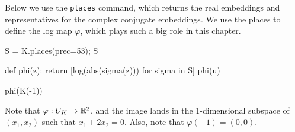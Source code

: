 Below we use the \verb|places| command, which returns the real embeddings
and representatives for the complex conjugate embeddings.
We use the places to define the log map $\varphi$, which plays such a big
role in this chapter.
\begin{sagecode} %
\begin{sagecell}
S = K.places(prec=53); S
\end{sagecell}
\begin{sageout}
\end{sageout}
\begin{sagecell}
def phi(z):
    return [log(abs(sigma(z))) for sigma in S]
phi(u)
\end{sagecell}
\begin{sageout}
[-1.3473773483293832, 0.673688674164692]
\end{sageout}
\begin{sagecell}
phi(K(-1))
\end{sagecell}
\begin{sageout}
[0.0, 0.0]
\end{sageout}
\end{sagecode}
Note that $\varphi:U_K \to \mathbb{R}^2$, and the image lands in the
1-dimensional subspace of $(x_1,x_2)$ such that $x_1 +2x_2 = 0$. Also,
note that $\varphi(-1)=(0,0)$.

